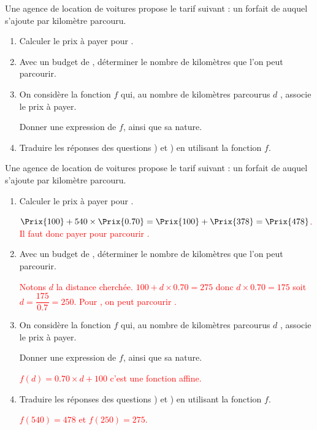 \begin{exercice*}
    Une agence de location de voitures propose le tarif suivant : un forfait de  auquel s'ajoute  par kilomètre parcouru.
    \begin{enumerate}
        \item Calculer le prix à payer pour .
        \item Avec un budget de , déterminer le nombre de kilomètres que l'on peut parcourir.
        \item On considère la fonction $f$ qui, au nombre de kilomètres parcourus $d$ , associe le prix à payer.
        
        Donner une expression de $f$, ainsi que sa nature.
        \item Traduire les réponses des questions \setcounter{enumi}{1}\theenumi ) et \setcounter{enumi}{2}\theenumi ) en utilisant la fonction $f$.
    \end{enumerate}
\end{exercice*}
\begin{corrige}
    Une agence de location de voitures propose le tarif suivant : un forfait de  auquel s'ajoute  par kilomètre parcouru.

    \begin{enumerate}
        \item Calculer le prix à payer pour .
        
        \textcolor{red}{$\Prix{100} + 540\times\Prix{0.70}=\Prix{100}+\Prix{378}=\Prix{478}$. Il faut donc payer  pour parcourir .}
        \item Avec un budget de , déterminer le nombre de kilomètres que l'on peut parcourir.
        
        \textcolor{red}{Notons $d$ la distance cherchée. $100+d\times\num{0.70}=275$ donc $d\times\num{0.70}=175$ soit $d=\dfrac{175}{0.7}=250$. Pour , on peut parcourir .}
        \item On considère la fonction $f$ qui, au nombre de kilomètres parcourus $d$ , associe le prix à payer.
        
        Donner une expression de $f$, ainsi que sa nature.

        \textcolor{red}{$f(d)=\num{0.70}\times d+100$ c'est une fonction affine.}
        \item Traduire les réponses des questions \setcounter{enumi}{1}\theenumi ) et \setcounter{enumi}{2}\theenumi ) en utilisant la fonction $f$.
        
        \textcolor{red}{$f(540)=478$ et $f(250)=275$.}
    \end{enumerate}
\end{corrige}
